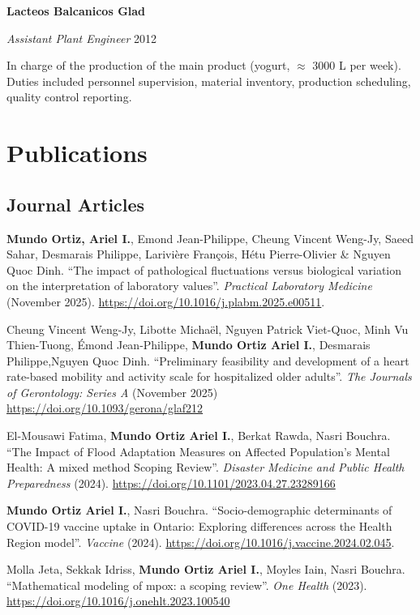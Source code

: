 \documentclass[10pt,]{article}
\providecommand{\tightlist}{%
  \setlength{\itemsep}{0pt}\setlength{\parskip}{0pt}}
\renewenvironment{itemize}{
  \begin{list}{}{
    \setlength{\leftmargin}{1.5em}
  }
}{
  \end{list}
}
\begin{document}
\textbf{Lacteos Balcanicos Glad}

\emph{Assistant Plant Engineer} \hfill 2012

\begin{itemize}
\tightlist
\item
  In charge of the production of the main product (yogurt, \(\approx\)
  3000 L per week). Duties included personnel supervision, material
  inventory, production scheduling, quality control reporting.
\end{itemize}

\section{Publications}\label{publications}

\subsection{Journal Articles}\label{journal-articles}

\textbf{Mundo Ortiz, Ariel I.}, Emond Jean-Philippe, Cheung Vincent
Weng-Jy, Saeed Sahar, Desmarais Philippe, Larivière François, Hétu
Pierre-Olivier \& Nguyen Quoc Dinh. ``The impact of pathological
fluctuations versus biological variation on the interpretation of
laboratory values''. \emph{Practical Laboratory Medicine} (November
2025). \url{https://doi.org/10.1016/j.plabm.2025.e00511}.

Cheung Vincent Weng-Jy, Libotte Michaël, Nguyen Patrick Viet-Quoc, Minh
Vu Thien-Tuong, Émond Jean-Philippe, \textbf{Mundo Ortiz Ariel I.},
Desmarais Philippe,Nguyen Quoc Dinh. ``Preliminary feasibility and
development of a heart rate-based mobility and activity scale for
hospitalized older adults''. \emph{The Journals of Gerontology: Series
A} (November 2025) \url{https://doi.org/10.1093/gerona/glaf212}

El-Mousawi Fatima, \textbf{Mundo Ortiz Ariel I.}, Berkat Rawda, Nasri
Bouchra. ``The Impact of Flood Adaptation Measures on Affected
Population's Mental Health: A mixed method Scoping Review''.
\emph{Disaster Medicine and Public Health Preparedness} (2024).
\url{https://doi.org/10.1101/2023.04.27.23289166}

\textbf{Mundo Ortiz Ariel I.}, Nasri Bouchra. ``Socio-demographic
determinants of COVID-19 vaccine uptake in Ontario: Exploring
differences across the Health Region model''. \emph{Vaccine} (2024).
\url{https://doi.org/10.1016/j.vaccine.2024.02.045}.

Molla Jeta, Sekkak Idriss, \textbf{Mundo Ortiz Ariel I.}, Moyles Iain,
Nasri Bouchra. ``Mathematical modeling of mpox: a scoping review''.
\emph{One Health} (2023).
\url{https://doi.org/10.1016/j.onehlt.2023.100540}
\end{document}
